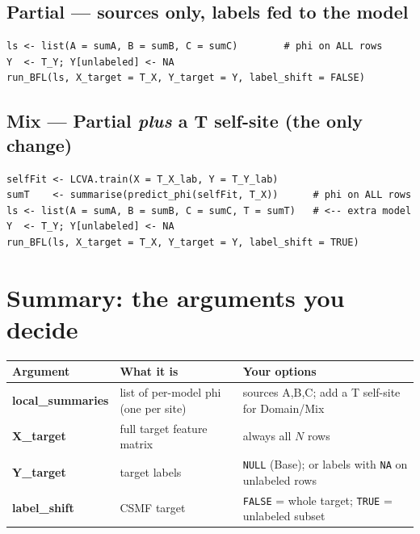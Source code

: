 \documentclass[11pt]{article}
\begin{document}
\subsection*{Partial --- sources only, labels fed to the model}
\begin{lstlisting}[style=R]
ls <- list(A = sumA, B = sumB, C = sumC)        # phi on ALL rows
Y  <- T_Y; Y[unlabeled] <- NA
run_BFL(ls, X_target = T_X, Y_target = Y, label_shift = FALSE)
\end{lstlisting}

\subsection*{Mix --- Partial \emph{plus} a T self-site (the only change)}
\begin{lstlisting}[style=R]
selfFit <- LCVA.train(X = T_X_lab, Y = T_Y_lab)
sumT    <- summarise(predict_phi(selfFit, T_X))      # phi on ALL rows
ls <- list(A = sumA, B = sumB, C = sumC, T = sumT)   # <-- extra model
Y  <- T_Y; Y[unlabeled] <- NA
run_BFL(ls, X_target = T_X, Y_target = Y, label_shift = TRUE)
\end{lstlisting}

\section{Summary: the arguments you decide}
\begin{center}
\renewcommand{\arraystretch}{1.3}
\begin{tabularx}{\textwidth}{@{}>{\ttfamily\bfseries}l Y Y@{}}
\toprule
\normalfont\textbf{Argument} & What it is & Your options\\
\midrule
local\_summaries & list of per-model phi (one per site) & sources A,B,C; add a T self-site for Domain/Mix\\
X\_target        & full target feature matrix           & always all $N$ rows\\
Y\_target        & target labels                        & \texttt{NULL} (Base); or labels with \texttt{NA} on unlabeled rows\\
label\_shift     & CSMF target                          & \texttt{FALSE} = whole target; \texttt{TRUE} = unlabeled subset\\
\bottomrule
\end{tabularx}
\end{center}
\end{document}
